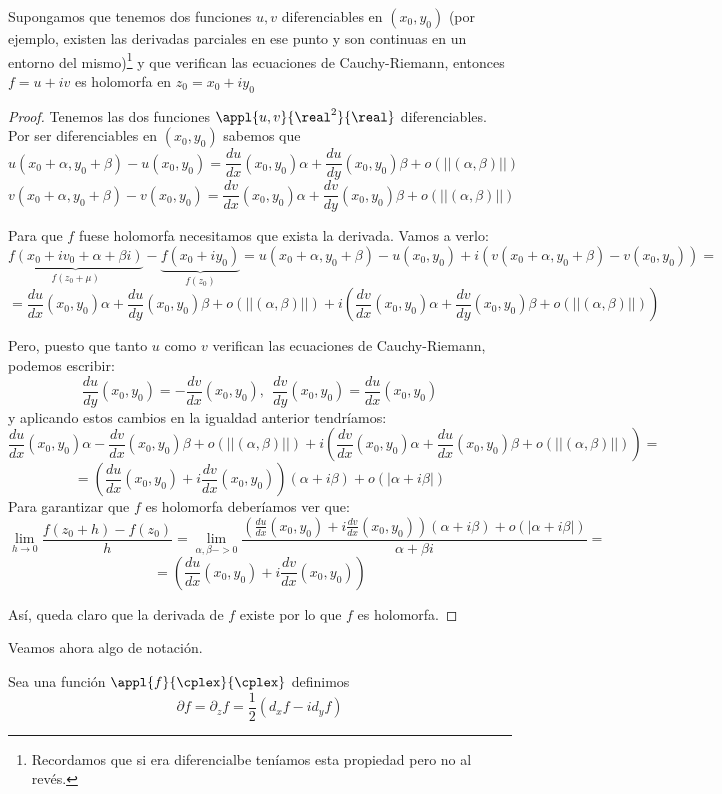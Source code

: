 \documentclass{apuntes}
\begin{document}
\begin{prop}
Supongamos que tenemos dos funciones $u,v$ diferenciables en $(x_0,y_0)$ (por ejemplo, existen las derivadas parciales en ese punto y son continuas en un entorno del mismo)\footnote{Recordamos que si era diferencialbe teníamos esta propiedad pero no al revés.} y que verifican las ecuaciones de Cauchy-Riemann, entonces $f=u+iv$ es holomorfa en $z_0=x_0+iy_0$
\end{prop}
\begin{proof}
Tenemos las dos funciones $\appl{u,v}{\real^2}{\real}$ diferenciables. Por ser diferenciables en $(x_0,y_0)$ sabemos que
\[u(x_0+α,y_0+β)-u(x_0,y_0)=\frac{du}{dx}(x_0,y_0)α+\frac{du}{dy}(x_0,y_0)β + o(||(α,β)||)\]
\[v(x_0+α,y_0+β)-v(x_0,y_0)=\frac{dv}{dx}(x_0,y_0)α+\frac{dv}{dy}(x_0,y_0)β + o(||(α,β)||)\]

Para que $f$ fuese holomorfa necesitamos que exista la derivada. Vamos a verlo:
\[\underbrace{f(x_0+iv_0+α+βi)}_{f(z_0+μ)}-\underbrace{f(x_0+iy_0)}_{f(z_0)} = u(x_0+α,y_0+β)-u(x_0,y_0) + i \left( v(x_0+α,y_0+β)-v(x_0,y_0)\right) = \]
\[= \frac{du}{dx}(x_0,y_0)α+\frac{du}{dy}(x_0,y_0)β + o(||(α,β)||)+i\left( \frac{dv}{dx}(x_0,y_0)α+\frac{dv}{dy}(x_0,y_0)β + o(||(α,β)||)\right)\]

Pero, puesto que tanto $u$ como $v$ verifican las ecuaciones de Cauchy-Riemann, podemos escribir:
\[\frac{du}{dy}(x_0,y_0)=-\frac{dv}{dx}(x_0,y_0), \ \ \frac{dv}{dy}(x_0,y_0)=\frac{du}{dx}(x_0,y_0) \]
y aplicando estos cambios en la igualdad anterior tendríamos:
\[\frac{du}{dx}(x_0,y_0)α-\frac{dv}{dx}(x_0,y_0)β + o(||(α,β)||)+i\left( \frac{dv}{dx}(x_0,y_0)α+\frac{du}{dx}(x_0,y_0)β + o(||(α,β)||)\right)=\]
\[=\left(\frac{du}{dx}(x_0,y_0)+i\frac{dv}{dx}(x_0,y_0)\right)(α+iβ)+o(|α+iβ|)\]
Para garantizar que $f$ es holomorfa deberíamos ver que:
\[\lim_{h\to 0} \frac{f(z_0+h)-f(z_0)}{h} = \lim_{α,β->0} \frac{\left(\frac{du}{dx}(x_0,y_0)+i\frac{dv}{dx}(x_0,y_0)\right)(α+iβ)+o(|α+iβ|)}{α+βi} = \]
\[= \left(\frac{du}{dx}(x_0,y_0)+i\frac{dv}{dx}(x_0,y_0)\right)\]

Así, queda claro que la derivada de $f$ existe por lo que $f$ es holomorfa.
\end{proof}

Veamos ahora algo de notación.

\begin{defn}
Sea una función $\appl{f}{\cplex}{\cplex}$ definimos
\[\partial f = \partial_z f = \frac{1}{2}(d_x f - i d_y f)\]
\end{defn}
\end{document}
